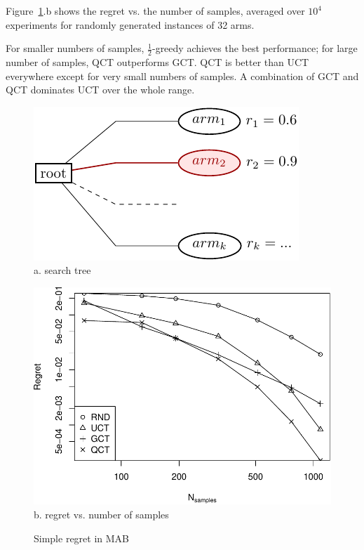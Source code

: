 \documentclass{article}
\begin{document}
Figure~\ref{fig:mab-simple-regret}.b shows the regret
vs. the number of samples, averaged
over $10^4$ experiments for randomly generated instances of 32 arms. 

For smaller numbers of samples, $\frac 1 2$-greedy achieves the best
performance; for large number of samples, QCT outperforms GCT. QCT is
better than UCT everywhere except for very small numbers of samples. A
combination of GCT and QCT dominates UCT over the whole range.

\begin{figure}[t]
  \begin{minipage}[c]{0.5\linewidth}
    \centering
    \includegraphics[scale=1.0]{onelevel-tree.pdf}\\
    \vspace{4em}
    a. search tree
  \end{minipage}
  \begin{minipage}[c]{0.5\linewidth}
    \centering
    \includegraphics[scale=0.5]{flat-trilevel-k=64-uqb=8.pdf}\\
    b. regret vs. number of samples
  \end{minipage}
  \label{fig:mab-simple-regret}
  \caption{Simple regret in MAB}
\end{figure}
\end{document}
